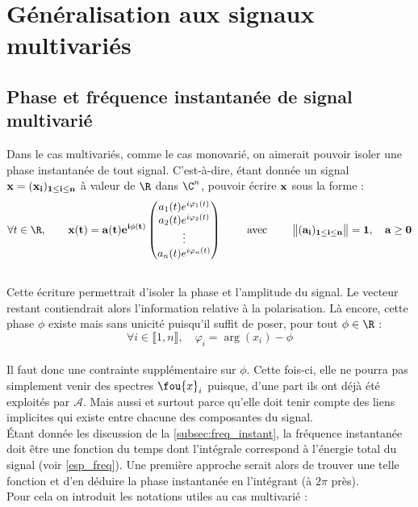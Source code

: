 \section{Généralisation aux signaux multivariés}\label{sec:sign_multivar}

\subsection{Phase et fréquence instantanée de signal multivarié}\label{subsec:param_instant_mvar}

Dans le cas multivariés, comme le cas monovarié, on aimerait pouvoir isoler une phase instantanée de tout signal. C'est-à-dire, étant donnée un signal $\bf{x}=(x_i)_{1\leq i\leq n}$ à valeur de $\R$ dans $\C^n$, pouvoir écrire $\bf{x}$ sous la forme :
\[\forall t\in\R,\qquad \bf{x}(t) = a(t)e^{i\phi(t)}\begin{pmatrix} a_1(t)e^{i\varphi_1(t)} \\ a_2(t)e^{i\varphi_2(t)} \\ \vdots \\ a_n(t)e^{i\varphi_n(t)}
\end{pmatrix} \qquad\text{ avec }\qquad \big\|(a_i)_{1\leq i\leq n}\big\|=1,\quad a\geq 0\]
\\
Cette écriture permettrait d'isoler la phase et l'amplitude du signal. Le vecteur restant contiendrait alors l'information relative à la polarisation. Là encore, cette phase $\phi$ existe mais sans unicité puisqu'il suffit de poser, pour tout $\phi\in\R$ :
\[\forall i\in\llbracket1,n\rrbracket,\quad \varphi_i = \arg(x_i)-\phi\]
\\
Il faut donc une contrainte supplémentaire sur $\phi$. Cette fois-ci, elle ne pourra pas simplement venir des spectres $\fou{x}_i$ puisque, d'une part ils ont déjà été exploités par $\mathcal{A}$. Mais aussi et surtout parce qu'elle doit tenir compte des liens implicites qui existe entre chacune des composantes du signal.
\\
\'Etant donnée les discussion de la \cref{subsec:freq_instant}, la fréquence instantanée doit être une fonction du temps dont l'intégrale correspond à l’énergie total du signal (voir \eqref{esp_freq}). Une première approche serait alors de trouver une telle fonction et d'en déduire la phase instantanée en l'intégrant (à $2\pi$ près).
\\
Pour cela on introduit les notations utiles au cas multivarié :
